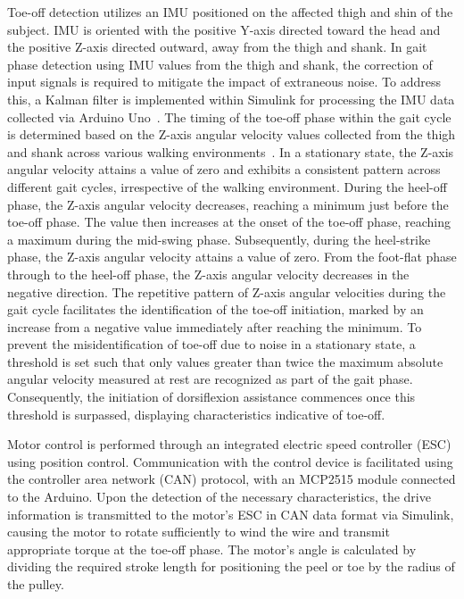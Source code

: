 \documentclass[actuators,article,accept,pdftex,moreauthors]{Definitions/mdpi}
\begin{document}
Toe-off detection utilizes an IMU positioned on the affected thigh and shin of the subject. IMU is oriented with the positive Y-axis directed toward the head and the positive Z-axis directed outward, away from the thigh and shank. In gait phase detection using IMU values from the thigh and shank, the correction of input signals is required to mitigate the impact of extraneous noise. To address this, a Kalman filter is implemented within Simulink for processing the IMU data collected via Arduino Uno~\cite{Welch1995}. The timing of the toe-off phase within the gait cycle is determined based on the Z-axis angular velocity values collected from the thigh and shank across various walking environments~\cite{Winter2009,Zeng2011}. In a stationary state, the Z-axis angular velocity attains a value of zero and exhibits a consistent pattern across different gait cycles, irrespective of the walking environment. During the heel-off phase, the Z-axis angular velocity decreases, reaching a minimum just before the toe-off phase. The value then increases at the onset of the toe-off phase, reaching a maximum during the mid-swing phase. Subsequently, during the heel-strike phase, the Z-axis angular velocity attains a value of zero. From the foot-flat phase through to the heel-off phase, the Z-axis angular velocity decreases in the negative direction. The repetitive pattern of Z-axis angular velocities during the gait cycle facilitates the identification of the toe-off initiation, marked by an increase from a negative value immediately after reaching the minimum. To prevent the misidentification of toe-off due to noise in a stationary state, a threshold is set such that only values greater than twice the maximum absolute angular velocity measured at rest are recognized as part of the gait phase. Consequently, the initiation of dorsiflexion assistance commences once this threshold is surpassed, displaying characteristics indicative of toe-off.

Motor control is performed through an integrated electric speed controller (ESC) using position control. Communication with the control device is facilitated using the controller area network (CAN) protocol, with an MCP2515 module connected to the Arduino. Upon the detection of the necessary characteristics, the drive information is transmitted to the motor's ESC in CAN data format via Simulink, causing the motor to rotate sufficiently to wind the wire and transmit appropriate torque at the toe-off phase. The motor's angle is calculated by dividing the required stroke length for positioning the peel or toe by the radius of the pulley.
\end{document}
